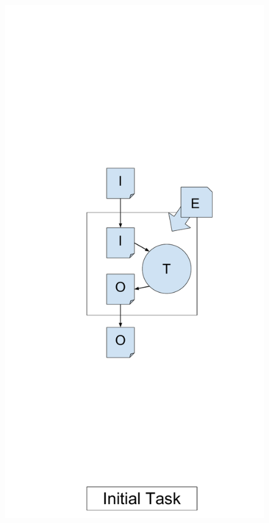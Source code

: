 \documentclass[conference]{IEEEtran}
\begin{document}
\begin{figure}[t]
\begin{minipage}[t]{0.17\textwidth}
  \includegraphics[width=\textwidth]{graphics/nested_sandbox_0_detail_wLlabel.pdf}
\end{minipage}

\end{figure}
\end{document}
